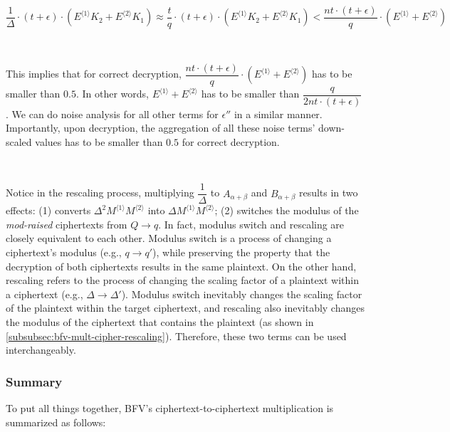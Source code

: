 $\dfrac{1}{\Delta}\cdot(t + \epsilon)\cdot(E^{\langle 1 \rangle}K_2 + E^{\langle 2 \rangle}K_1) \approx \dfrac{t}{q}\cdot(t + \epsilon)\cdot(E^{\langle 1 \rangle}K_2 + E^{\langle 2 \rangle}K_1) < \dfrac{nt \cdot (t + \epsilon)}{q} \cdot (E^{\langle 1 \rangle} + E^{\langle 2 \rangle})$

$ $

This implies that for correct decryption, $\dfrac{nt \cdot (t + \epsilon)}{q} \cdot (E^{\langle 1 \rangle} + E^{\langle 2 \rangle})$ has to be smaller than $0.5$. In other words, $E^{\langle 1 \rangle} + E^{\langle 2 \rangle}$ has to be smaller than $\dfrac{q}{2nt \cdot (t + \epsilon)}$. We can do noise analysis for all other terms for $\epsilon''$ in a similar manner. Importantly, upon decryption, the aggregation of all these noise terms' down-scaled values has to be smaller than $0.5$ for correct decryption. 

$ $

Notice in the rescaling process, multiplying $\dfrac{1}{\Delta}$ to $A_{\alpha + \beta}$ and $B_{\alpha + \beta}$ results in two effects: (1) converts $\Delta^2 M^{\langle 1 \rangle} M^{\langle 2 \rangle}$ into $\Delta M^{\langle 1 \rangle}  M^{\langle 2 \rangle}$; (2) switches the modulus of the \textit{mod-raised} ciphertexts from $Q \rightarrow q$. 
In fact, modulus switch and rescaling are closely equivalent to each other. Modulus switch is a process of changing a ciphertext's modulus (e.g., $q \rightarrow q'$), while preserving the property that the decryption of both ciphertexts results in the same plaintext. On the other hand, rescaling refers to the process of changing the scaling factor of a plaintext within a ciphertext (e.g., $\Delta \rightarrow \Delta'$). Modulus switch inevitably changes the scaling factor of the plaintext within the target ciphertext, and rescaling also inevitably changes the modulus of the ciphertext that contains the plaintext (as shown in \autoref{subsubsec:bfv-mult-cipher-rescaling}). Therefore, these two terms can be used interchangeably. 


\subsubsection{Summary}
\label{subsubsec:bfv-mult-cipher-summary}

To put all things together, BFV's ciphertext-to-ciphertext multiplication is summarized as follows:

